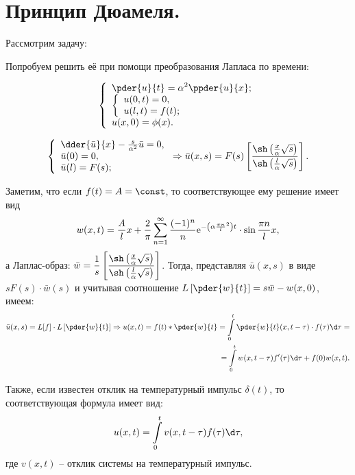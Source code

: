 \chapter{Принцип Дюамеля.}

\begin{minipage}{.55\textwidth}
    Рассмотрим задачу:

    Попробуем решить её при помощи преобразования Лапласа по времени:
\end{minipage}
\hfill
\begin{minipage}{.4\textwidth}
    \[
        \left\{ \begin{array}{l}
            \ds \pder{u}{t} = \alpha^2 \ppder{u}{x}; \\
                \left\{ \begin{array}{l}
                    u(0, t) = 0, \\
                    u(l, t) = f(t); 
                \end{array} \right. \\
            u(x, 0) = \phi(x).
        \end{array} \right.
    \]
\end{minipage}

\[
    \left\{ \begin{array}{l}
        \dder{\bar{u}}{x} - \frac{s}{\alpha^2}\bar{u} = 0, \\
        \bar{u}(0) = 0, \\
        \bar{u}(l) = F(s);
    \end{array} \right.
    \Rightarrow
    \bar{u}(x, s) = F(s)\left[\frac{\sh\left(\frac{x}{\alpha}\sqrt{s}\right)}
    {\sh\left(\frac{l}{\alpha}\sqrt{s}\right)}\right].
\]

Заметим, что если \( f(t) = A = \const \), то соответствующее ему решение имеет
вид
\[
    w(x, t) = \frac{A}{l}x + \frac{2}{\pi}\sum\limits_{n=1}^\infty
    \frac{(-1)^n}{n}\mathrm{e}^{-\left(\alpha\frac{\pi n}{l}^2\right)t}\cdot
    \sin\frac{\pi n}{l}x,
\]
а Лаплас-образ: \( \ds \bar{w} = \frac{1}{s}\left[\frac{\sh\left(
\frac{x}{\alpha}\sqrt{s}\right)}{\sh\left(\frac{l}{\alpha}\sqrt{s}\right)}
\right] \).
Тогда, представляя \( \bar{u}(x, s) \) в виде \( sF(s)\cdot\bar{w}(s) \) и
учитывая соотношение \( \ds L\left[\pder{w}{t}\right] = s\bar{w} - w(x, 0) \),
имеем:
\begin{align*}
    \bar{u}(x, s) = L[f]\cdot L\left[\pder{w}{t}\right] \Rightarrow
    u(x, t) = f(t)*\pder{w}{t} = \int\limits_0^t \pder{w}{t}(x, t-\tau)\cdot
    f(\tau)\d\tau = \\
    = \int\limits_0^t w(x, t - \tau)f'(\tau)\d\tau + f(0)w(x, t).
\end{align*}

Также, если известен отклик на температурный импульс \( \delta(t) \), то
соответствующая формула имеет вид:
\[
    u(x, t) = \int\limits_0^t v(x, t - \tau)f(\tau)\d\tau,
\]
где \( v(x, t) \) -- отклик системы на температурный импульс.

\newpage
